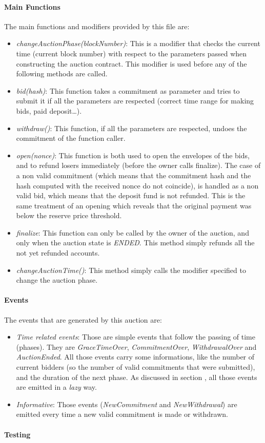 \documentclass[11pt, a4paper]{report}
\begin{document}
	\paragraph{Main Functions}
	The main functions and modifiers provided by this file are:
	\begin{itemize}
		\item \emph{changeAuctionPhase(blockNumber)}: This is a modifier that checks the current time (current block number) with respect to the parameters passed when constructing the auction contract. This modifier is used before any of the following methods are called.
		\item \emph{bid(hash)}: This function takes a commitment as parameter and tries to submit it if all the parameters are respected (correct time range for making bids, paid deposit\dots).
		\item \emph{withdraw()}: This function, if all the parameters are respected, undoes the commitment of the function caller.  
		\item \emph{open(nonce)}: This function is both used to open the envelopes of the bids, and to refund losers immediately (before the owner calls finalize). The case of a non valid commitment (which means that the commitment hash and the hash computed with the received nonce do not coincide), is handled as a non valid bid, which means that the deposit fund is not refunded. This is the same treatment of an opening which reveals that the original payment was below the reserve price threshold.
		\item \emph{finalize}: This function can only be called by the owner of the auction, and only when the auction state is \emph{ENDED}. This method simply refunds all the not yet refunded accounts.
		\item \emph{changeAuctionTime()}: This method simply calls the modifier specified to change the auction phase.
	\end{itemize}

	\paragraph*{Events}
	The events that are generated by this auction are:
	\begin{itemize}
		\item \emph{Time related events}: Those are simple events that follow the passing of time (phases). They are \emph{GraceTimeOver}, \emph{CommitmentOver}, \emph{WithdrawalOver} and \emph{AuctionEnded}. All those events carry some informations, like the number of current bidders (so the number of valid commitments that were submitted), and the duration of the next phase. As discussed in section , all those events are emitted in a \emph{lazy} way.
		\item \emph{Informative}: Those events (\emph{NewCommitment} and \emph{NewWithdrawal}) are emitted every time a new valid commitment is made or withdrawn.
	\end{itemize}
	
	\paragraph*{Testing}

	
	
\end{document}

